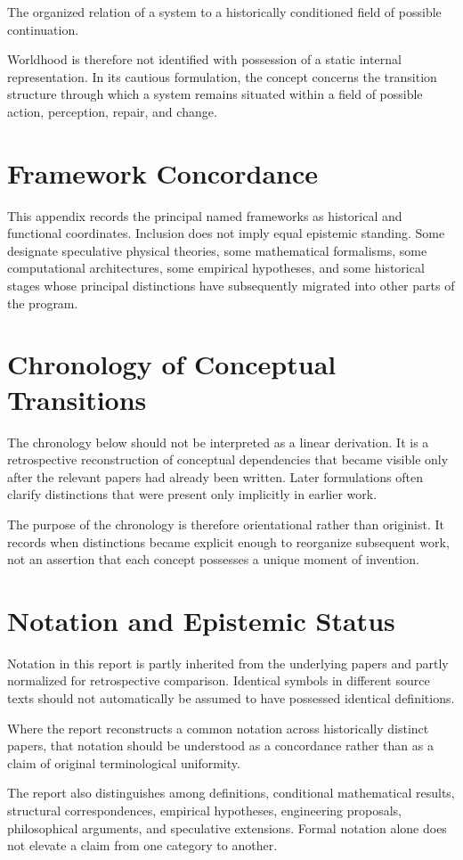 \documentclass[11pt]{article}
\theoremstyle{remark}
\begin{document}
The organized relation of a system to a historically conditioned field of
possible continuation.

Worldhood is therefore not identified with possession of a static internal
representation. In its cautious formulation, the concept concerns the
transition structure through which a system remains situated within a field of
possible action, perception, repair, and change.

\clearpage

\section{Framework Concordance}

This appendix records the principal named frameworks as historical and
functional coordinates. Inclusion does not imply equal epistemic standing.
Some designate speculative physical theories, some mathematical formalisms,
some computational architectures, some empirical hypotheses, and some
historical stages whose principal distinctions have subsequently migrated into
other parts of the program.


\clearpage

\section{Chronology of Conceptual Transitions}

The chronology below should not be interpreted as a linear derivation. It is a
retrospective reconstruction of conceptual dependencies that became visible
only after the relevant papers had already been written. Later formulations
often clarify distinctions that were present only implicitly in earlier work.

The purpose of the chronology is therefore orientational rather than
originist. It records when distinctions became explicit enough to reorganize
subsequent work, not an assertion that each concept possesses a unique moment
of invention.

\clearpage

\section{Notation and Epistemic Status}

Notation in this report is partly inherited from the underlying papers and
partly normalized for retrospective comparison. Identical symbols in different
source texts should not automatically be assumed to have possessed identical
definitions.

Where the report reconstructs a common notation across historically distinct
papers, that notation should be understood as a concordance rather than as a
claim of original terminological uniformity.

The report also distinguishes among definitions, conditional mathematical
results, structural correspondences, empirical hypotheses, engineering
proposals, philosophical arguments, and speculative extensions. Formal
notation alone does not elevate a claim from one category to another.
\end{document}
